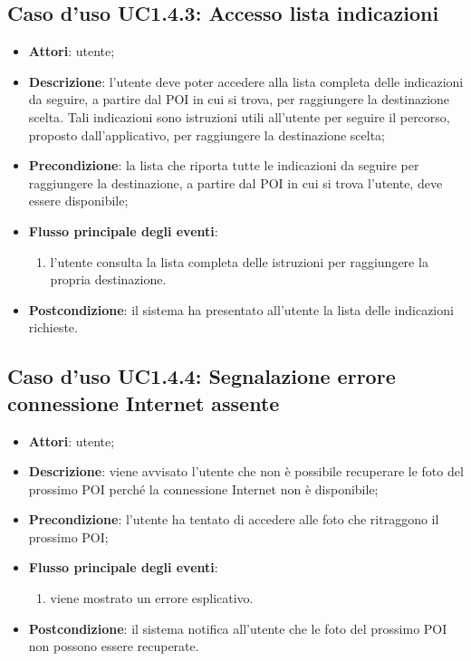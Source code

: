 \documentclass[../AnalisiDeiRequisiti.tex]{subfiles}
\begin{document}
\subsection{Caso d'uso UC1.4.3: Accesso lista indicazioni}
\begin{itemize}
	\item \textbf{Attori}: utente;
	\item \textbf{Descrizione}: l'utente deve poter accedere alla lista completa delle indicazioni da seguire, a partire dal POI in cui si trova, per raggiungere la destinazione scelta. Tali indicazioni sono istruzioni utili all'utente per seguire il percorso, proposto dall'applicativo, per raggiungere la destinazione scelta; 
	\item \textbf{Precondizione}: la lista che riporta tutte le indicazioni da seguire per raggiungere la destinazione, a partire dal POI in cui si trova l'utente, deve essere disponibile;
	
	\item \textbf{Flusso principale degli eventi}:
	\begin{enumerate}
		\item l'utente consulta la lista completa delle istruzioni per raggiungere la propria destinazione.
		
	\end{enumerate}
	\item \textbf{Postcondizione}: il sistema ha presentato all'utente la lista delle indicazioni richieste.
\end{itemize}
\hypertarget{UC1.4.4}{}
\subsection{Caso d'uso UC1.4.4: Segnalazione errore connessione Internet assente}
\begin{itemize}
	\item \textbf{Attori}: utente;
	\item \textbf{Descrizione}: viene avvisato l'utente che non è possibile recuperare le foto del prossimo POI perché la connessione Internet non è disponibile; 
	\item \textbf{Precondizione}: l'utente ha tentato di accedere alle foto che ritraggono il prossimo POI;
	
	\item \textbf{Flusso principale degli eventi}:
	\begin{enumerate}
		\item viene mostrato un errore esplicativo.
		
	\end{enumerate}
	\item \textbf{Postcondizione}: il sistema notifica all'utente che le foto del prossimo POI non possono essere recuperate.
\end{itemize}
\hypertarget{UC1.5}{}
\end{document}
